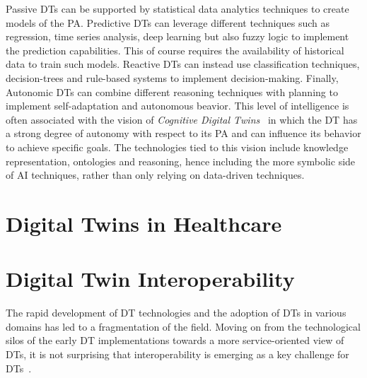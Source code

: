 Passive \acp{DT} can be supported by statistical data analytics techniques to create models of the \ac{PA}. 
%
Predictive \acp{DT} can leverage different techniques such as regression, time series analysis, deep learning but also fuzzy logic to implement the prediction capabilities. 
%
This of course requires the availability of historical data to train such models. 
%
Reactive \acp{DT} can instead use classification techniques, decision-trees and rule-based systems to implement decision-making. 
%
Finally, Autonomic \acp{DT} can combine different reasoning techniques with planning to implement self-adaptation and autonomous beavior.
%
This level of intelligence is often associated with the vision of \emph{Cognitive Digital Twins}~\cite{Zheng_Lu_Kiritsis_2022,Intizar_Ali_Patel_G_Breslin_Harik_Sheth_2021} in which the \ac{DT} has a strong degree of autonomy with respect to its \ac{PA} and can influence its behavior to achieve specific goals.
%
The technologies tied to this vision include knowledge representation, ontologies and reasoning, hence including the more symbolic side of \ac{AI} techniques, rather than only relying on data-driven techniques.

\section{Digital Twins in Healthcare}




\section{Digital Twin Interoperability}

The rapid development of \ac{DT} technologies and the adoption of \acp{DT} in various domains has led to a fragmentation of the field. 
%
Moving on from the technological silos of the early \ac{DT} implementations towards a more service-oriented view of \acp{DT},
it is not surprising that interoperability is emerging as a key challenge for \acp{DT}~\cite{piroumian2021interoperability,Rebelo_Moreira_2024}. 


